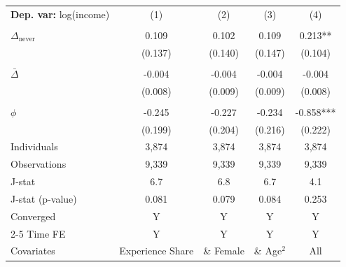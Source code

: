 \begin{tabular}{l cccc} \toprule  \textbf{Dep. var:}  log(income) 
                    &\multicolumn{1}{c}{(1)}   &\multicolumn{1}{c}{(2)}   &\multicolumn{1}{c}{(3)}   &\multicolumn{1}{c}{(4)}   \\
                    &               &               &               &               \\
\addlinespace
$\Delta_{\text{never}}$&       0.109   &       0.102   &       0.109   &       0.213** \\
                    &     (0.137)   &     (0.140)   &     (0.147)   &     (0.104)   \\
                    &               &               &               &               \\
\addlinespace
$\bar{\Delta}$      &      -0.004   &      -0.004   &      -0.004   &      -0.004   \\
                    &     (0.008)   &     (0.009)   &     (0.009)   &     (0.008)   \\
                    &               &               &               &               \\
\addlinespace
$\phi$              &      -0.245   &      -0.227   &      -0.234   &      -0.858***\\
                    &     (0.199)   &     (0.204)   &     (0.216)   &     (0.222)   \\
\addlinespace
Individuals         &       3,874   &       3,874   &       3,874   &       3,874   \\
Observations        &       9,339   &       9,339   &       9,339   &       9,339   \\
J-stat              &         6.7   &         6.8   &         6.7   &         4.1   \\
J-stat (p-value)    &       0.081   &       0.079   &       0.084   &       0.253   \\
Converged           &           Y   &           Y   &           Y   &           Y   \\
\cmidrule{2-5} Time FE & Y & Y & Y & Y \\ Covariates & Experience Share & \& Female & \& Age$^2$ & All \\ \bottomrule \end{tabular}
